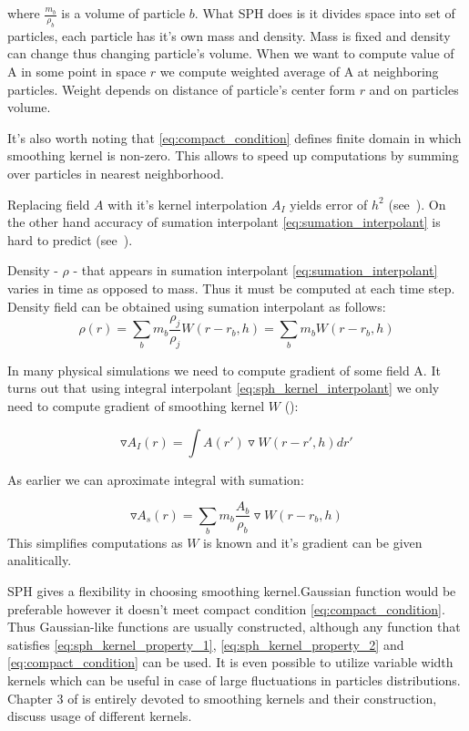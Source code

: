 where $\frac{m_b}{\rho_b}$ is a volume of particle $b$. What SPH does is it divides space into set of particles, each particle has it's own mass and density. Mass is fixed and density can change thus changing particle's volume. When we want to compute value of A in some point in space $r$ we compute weighted average of A at neighboring particles. Weight depends on distance of particle's center form $r$ and on particles volume. 

It's also worth noting that \ref{eq:compact_condition} defines finite domain in which smoothing kernel is non-zero. This allows to speed up computations by summing over particles in nearest neighborhood.

Replacing field $A$ with it's kernel interpolation $A_I$ yields error of $h^2$ (see~\cite[section 2.2.1]{Liu}). On the other hand accuracy of sumation interpolant \ref{eq:sumation_interpolant} is hard to predict (see~\cite[section 12.1]{Monaghan1992}).

Density - $\rho$ - that appears in sumation interpolant \ref{eq:sumation_interpolant} varies in time as opposed to mass. Thus it must be computed at each time step. Density field can be obtained using sumation interpolant as follows:
\begin{equation}
\label{eq:sph_density}
\rho(r) = \sum_{b}m_b\frac{\rho_j}{\rho_j}W(r-r_b, h) = \sum_{b}m_b W(r-r_b, h)
\end{equation}

In many physical simulations we need to compute gradient of some field A. It turns out that using integral interpolant \ref{eq:sph_kernel_interpolant} we only need to compute gradient of smoothing kernel $W$ (\cite[section 2.2.2]{Liu}):

\begin{equation}
\label{eq:integral_interpolant_gradient}
\triangledown A_I(r) = \int A(r') \triangledown W(r - r', h)dr'
\end{equation}

As earlier we can aproximate integral with sumation:

\begin{equation}
\label{eq:sumation_interpolant_gradient}
\triangledown A_s(r) = \sum_{b}m_b\frac{A_b}{\rho_b}\triangledown W(r-r_b,h) 
\end{equation}
This simplifies computations as $W$ is known and it's gradient can be given analitically. 

SPH gives a flexibility in choosing smoothing kernel.Gaussian function would be preferable however it doesn't meet compact condition \ref{eq:compact_condition}. Thus Gaussian-like functions are usually constructed, although any function that satisfies \ref{eq:sph_kernel_property_1}, \ref{eq:sph_kernel_property_2} and \ref{eq:compact_condition} can be used. It is even possible to utilize variable width kernels \cite[section 6]{Monaghan1992} which can be useful in case of large fluctuations in particles distributions. Chapter 3 of \cite{Liu} is entirely devoted to smoothing kernels and their construction, \cite[section 3.5]{Muller2003} discuss usage of different kernels. 


